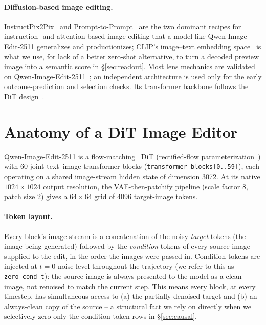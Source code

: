 \documentclass[10pt,twocolumn,letterpaper]{article}
\newcommand{\model}{Qwen-Image-Edit-2511}
\begin{document}
\paragraph{Diffusion-based image editing.} InstructPix2Pix~\citep{brooks2023instructpix2pix}
and Prompt-to-Prompt~\citep{hertz2023prompttoprompt} are the two
dominant recipes for instruction- and attention-based image editing that
a model like \model{} generalizes and productionizes; CLIP's
image--text embedding space~\citep{radford2021clip} is what we use, for
lack of a better zero-shot alternative, to turn a decoded preview image
into a semantic score in \S\ref{sec:readout}. Most lens mechanics are
validated on \model{}~\citep{qwen2025image}; an independent architecture
is used only for the early outcome-prediction and selection checks. Its
transformer backbone follows
the DiT design~\citep{peebles2023dit}.

\section{Anatomy of a DiT Image Editor}\label{sec:prelim}

\model{} is a flow-matching~\citep{lipman2023flowmatching} DiT
(rectified-flow parameterization~\citep{liu2023rectifiedflow}) with 60
joint text--image transformer blocks (\texttt{transformer\_blocks[0..59]}),
each operating on a shared image-stream hidden state of dimension 3072.
At its native $1024\times1024$ output resolution, the VAE-then-patchify
pipeline (scale factor 8, patch size 2) gives a $64\times64$ grid of
4096 target-image tokens.

\paragraph{Token layout.} Every block's image stream is a concatenation
of the noisy \emph{target} tokens (the image being generated) followed
by the \emph{condition} tokens of every source image supplied to the
edit, in the order the images were passed in. Condition tokens are
injected at $t{=}0$ noise level throughout the trajectory (we refer to
this as \texttt{zero\_cond\_t}): the source image is always presented to
the model as a clean image, not renoised to match the current step. This
means every block, at every timestep, has simultaneous access to (a) the
partially-denoised target and (b) an always-clean copy of the source --
a structural fact we rely on directly when we selectively zero only the
condition-token rows in \S\ref{sec:causal}.
\end{document}
